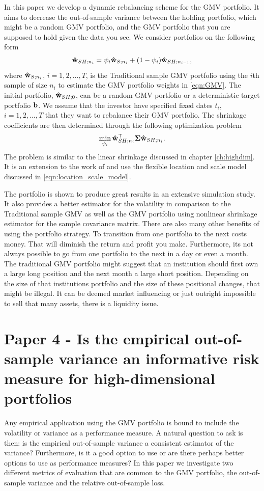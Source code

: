 \documentclass[oneside]{book}\usepackage{knitr}
\begin{document}
In this paper we develop a dynamic rebalancing scheme for the GMV portfolio. 
It aims to decrease the out-of-sample variance between the holding portfolio, which might be a random GMV portfolio, and the GMV portfolio that you are supposed to hold given the data you see. 
We consider portfolios on the following form
\begin{equation}
  \mathbf{\hat{w}}_{SH;n_{i}}=\psi_{i}\mathbf{\hat{w}}_{S;n_i}+ (1-\psi_{i})\mathbf{\hat{w}}_{SH;n_{i-1}},
\end{equation}
where $\mathbf{\hat{w}}_{S;n_i}$, $i=1,2,...,T$, is the Traditional sample GMV portfolio using the $i$th sample of size $n_i$ to estimate the GMV portfolio weights in \eqref{eqn:GMV}. 
The initial portfolio, $\mathbf{\hat{w}}_{SH;0}$, can be a random GMV portfolio or a deterministic target portfolio $\mathbf{b}$.
We assume that the investor have specified fixed dates $t_i$, $i=1,2,...,T$ that they want to rebalance their GMV portfolio. 
The shrinkage coefficients are then determined through the following optimization problem
$$
\min_{\psi_i} \mathbf{\hat{w}}_{SH;n_{i}}^\top \mathbf{\Sigma} \mathbf{\hat{w}}_{SH;n_{i}}.
$$
The problem is similar to the linear shrinkage discussed in chapter \ref{ch:highdim}.
It is an extension to the work of \citet{bodnar2018estimation} and use the flexible location and scale model discussed in \eqref{eqn:location_scale_model}.

The portfolio is shown to produce great results in an extensive simulation study.
It also provides a better estimator for the volatility in comparison to the Traditional sample GMV as well as the GMV portfolio using \citet{lw20} nonlinear shrinkage estimator for the sample covariance matrix.
There are also many other benefits of using the portfolio strategy.
To transition from one portfolio to the next costs money.
That will diminish the return and profit you make.
Furthermore, its not always possible to go from one portfolio to the next in a day or even a month.
The traditional GMV portfolio might suggest that an institution should first own a large long position and the next month a large short position.
Depending on the size of that institutions portfolio and the size of these positional changes, that might be illegal. 
It can be deemed market influencing or just outright impossible to sell that many assets, there is a liquidity issue.

\section{Paper 4 - Is the empirical out-of-sample variance an informative risk measure for high-dimensional portfolios}\label{sec:paper4}
Any empirical application using the GMV portfolio is bound to include the volatility or variance as a performance measure. 
A natural question to ask is then: is the empirical out-of-sample variance a consistent estimator of the variance? 
Furthermore, is it a good option to use or are there perhaps better options to use as performance measures? 
In this paper we investigate two different metrics of evaluation that are common to the GMV portfolio, the out-of-sample variance and the relative out-of-sample loss.   
\end{document}

